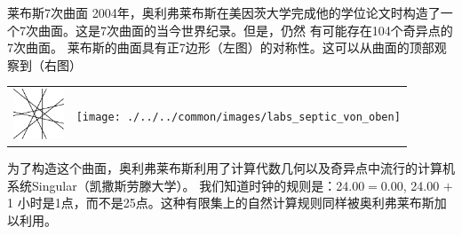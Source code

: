 ﻿\begin{surferPage}{莱布斯7次曲面}
2004年，奥利弗莱布斯在美因茨大学完成他的学位论文时构造了一个7次曲面。这是7次曲面的当今世界纪录。但是，仍然
有可能存在104个奇异点的7次曲面。  莱布斯的曲面具有正7边形（左图）的对称性。这可以从曲面的顶部观察到（右图）

    \vspace*{-0.3em}
    \begin{center}
      \begin{tabular}{c@{\qquad}c}
        \includegraphics[height=1.5cm]{./../../common/images/labsseptic1.pdf}
        &
        \texttt{[image: ./../../common/images/labs\_septic\_von\_oben]}
      \end{tabular}
    \end{center}
    \vspace*{-0.3em}

为了构造这个曲面，奥利弗莱布斯利用了计算代数几何以及奇异点中流行的计算机系统{\sc Singular}（凯撒斯劳滕大学）。
我们知道时钟的规则是：24.00$=$0.00, 24.00 $+$ 1 小时是1点，而不是25点。这种有限集上的自然计算规则同样被奥利弗莱布斯加以利用。
\end{surferPage}

